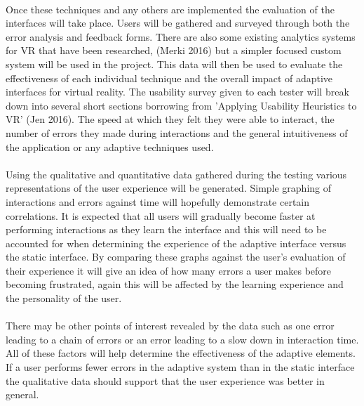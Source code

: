 \documentclass[11pt]{article}
\begin{document}
\paragraph{} 
Once these techniques and any others are implemented the evaluation of the interfaces will take place. Users will be gathered and surveyed through both the error analysis and feedback forms. There are also some existing analytics systems for VR that have been researched, (Merki 2016) but a simpler focused custom system will be used in the project. This data will then be used to evaluate the effectiveness of each individual technique and the overall impact of adaptive interfaces for virtual reality. The usability survey given to each tester will break down into several short sections borrowing from 'Applying Usability Heuristics to VR' (Jen 2016). The speed at which they felt they were able to interact, the number of errors they made during interactions and the general intuitiveness of the application or any adaptive techniques used.

\paragraph{}
Using the qualitative and quantitative data gathered during the testing various representations of the user experience will be generated. Simple graphing of interactions and errors against time will hopefully demonstrate certain correlations. It is expected that all users will gradually become faster at performing interactions as they learn the interface and this will need to be accounted for when determining the experience of the adaptive interface versus the static interface. By comparing these graphs against the user's evaluation of their experience it will give an idea of how many errors a user makes before becoming frustrated, again this will be affected by the learning experience and the personality of the user. 

\paragraph{}
There may be other points of interest revealed by the data such as one error leading to a chain of errors or an error leading to a slow down in interaction time. All of these factors will help determine the effectiveness of the adaptive elements. If a user performs fewer errors in the adaptive system than in the static interface the qualitative data should support that the user experience was better in general.
\end{document}
